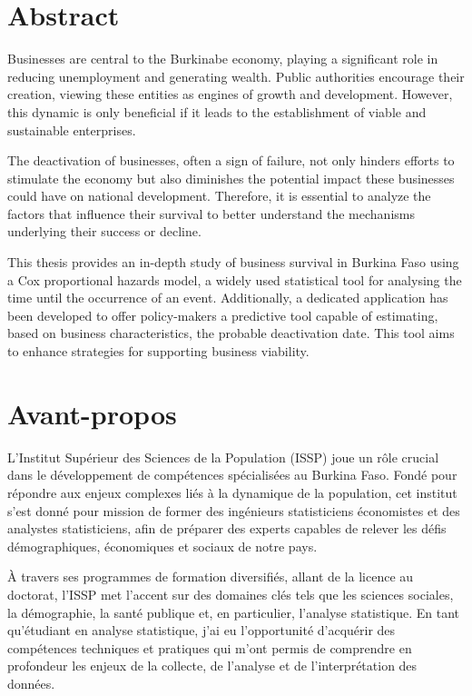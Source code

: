\documentclass[a4paper,12pt]{report}
\begin{document}
\chapter*{Abstract}
Businesses are central to the Burkinabe economy, playing a significant role in reducing unemployment and generating wealth. Public authorities encourage their creation, viewing these entities as engines of growth and development. However, this dynamic is only beneficial if it leads to the establishment of viable and sustainable enterprises.

The deactivation of businesses, often a sign of failure, not only hinders efforts to stimulate the economy but also diminishes the potential impact these businesses could have on national development. Therefore, it is essential to analyze the factors that influence their survival to better understand the mechanisms underlying their success or decline.

This thesis provides an in-depth study of business survival in Burkina Faso using a Cox proportional hazards model, a widely used statistical tool for analysing the time until the occurrence of an event. Additionally, a dedicated application has been developed to offer policy-makers a predictive tool capable of estimating, based on business characteristics, the probable deactivation date. This tool aims to enhance strategies for supporting business viability.




\chapter*{Avant-propos}
L'Institut Supérieur des Sciences de la Population (ISSP) joue un rôle crucial dans le développement de compétences spécialisées au Burkina Faso. Fondé pour répondre aux enjeux complexes liés à la dynamique de la population, cet institut s'est donné pour mission de former des ingénieurs statisticiens économistes et des analystes statisticiens, afin de préparer des experts capables de relever les défis démographiques, économiques et sociaux de notre pays.

À travers ses programmes de formation diversifiés, allant de la licence au doctorat, l'ISSP met l'accent sur des domaines clés tels que les sciences sociales, la démographie, la santé publique et, en particulier, l'analyse statistique. En tant qu'étudiant en analyse statistique, j'ai eu l'opportunité d'acquérir des compétences techniques et pratiques qui m'ont permis de comprendre en profondeur les enjeux de la collecte, de l'analyse et de l'interprétation des données.
\end{document}
